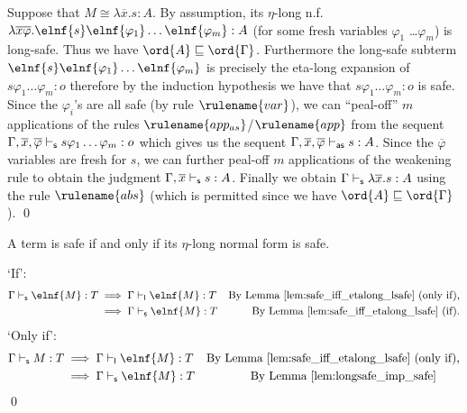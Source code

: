 Suppose that $M \cong \lambda \overline{x} . s : A$.
By assumption, its  $\eta$-long n.f.\
$\lambda \overline{x} \overline{\varphi} . \elnf{s} \elnf{\varphi_1} \ldots \elnf{\varphi_m}: A$ (for
some fresh variables $\varphi_1$ \ldots $\varphi_m$) is long-safe.
Thus we have $\ord{A}\sqsubseteq\ord{\Gamma}$.
Furthermore the long-safe subterm $\elnf{s} \elnf{\varphi_1} \ldots \elnf{\varphi_m}$ is precisely the eta-long expansion of $s\varphi_1 \ldots \varphi_m : o$ therefore by the induction hypothesis we have that $s \varphi_1 \ldots \varphi_m :o$ is safe.
Since the $\varphi_i$'s are all safe (by rule $\rulename{var}$), we can ``peal-off'' $m$ applications of the rules
$\rulename{app_{as}}$/$\rulename{app}$ from the sequent $\Gamma, \overline{x}, \overline{\varphi} \vdash_{\sf s} s \varphi_1 \ldots \varphi_m :o$ which gives us the sequent $\Gamma, \overline{x}, \overline{\varphi} \vdash_{\sf as} s : A$.
Since the $\overline{\varphi}$ variables are fresh for $s$, we can further peal-off $m$ applications of the weakening rule to obtain the judgment $\Gamma, \overline{x} \vdash_{\sf s} s : A$. Finally we obtain
$\Gamma \vdash_{\sf s} \lambda \overline{x} . s : A$ using the rule
$\rulename{abs}$ (which is permitted since we have $\ord{A}\sqsubseteq\ord{\Gamma}$).
\qed
\smallskip






\begin{proposition}
\label{prop:safe_iff_elnfsafe}
A term is safe if and only if its $\eta$-long normal form is safe.
\end{proposition}
\proof
`If':
\begin{align*}
  \Gamma \sentail \elnf{M}:T &\implies   \Gamma \lsentail \elnf{M}:T &  \mbox{By Lemma \ref{lem:safe_iff_etalong_lsafe} (only if),} \\
  &\implies   \Gamma \sentail \elnf{M}:T &  \mbox{By Lemma \ref{lem:safe_iff_etalong_lsafe} (if).}
\end{align*}
`Only if':
\begin{align*}
  \Gamma \sentail M:T &\implies   \Gamma \lsentail \elnf{M}:T &  \mbox{By Lemma \ref{lem:safe_iff_etalong_lsafe} (only if),} \\
  &\implies \Gamma \sentail \elnf{M}:T &  \mbox{By Lemma \ref{lem:longsafe_imp_safe}\qquad }
\end{align*}
\qed


